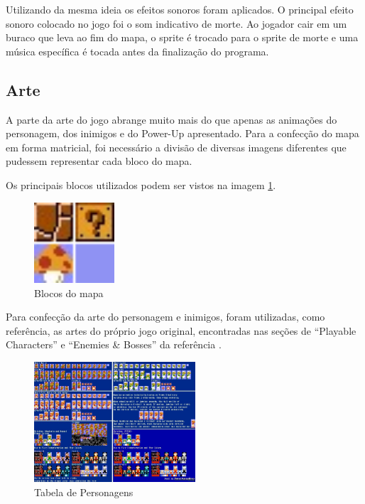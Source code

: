 \documentclass[11pt, twocolumn]{extarticle}
\begin{document}
Utilizando da mesma ideia os efeitos sonoros foram aplicados. O principal efeito sonoro colocado no jogo foi o som indicativo de morte. Ao jogador cair em um buraco que leva ao fim do mapa, o sprite é trocado para o sprite de morte e uma música específica é tocada antes da finalização do programa.

\subsection{Arte}
\label{Artes}
\indent \indent A parte da arte do jogo abrange muito mais do que apenas as animações do personagem, dos inimigos e do Power-Up apresentado. Para a confecção do mapa em forma matricial, foi necessário a divisão de diversas imagens diferentes que pudessem representar cada bloco do mapa.

Os principais blocos utilizados podem ser vistos na imagem \ref{image: Blocos do mapa}.

\begin{figure}[H]
	\centering
	\includegraphics[width=3cm]{figuras/Blocos.png}
	\caption{Blocos do mapa}
	\label{image: Blocos do mapa}
\end{figure}

Para confecção da arte do personagem e inimigos, foram utilizadas, como referência, as artes do próprio jogo original, encontradas nas seções de “Playable Characters” e “Enemies \& Bosses” da referência \cite{Sprites}. 

\begin{figure}[H]
	\centering
	\includegraphics[width=6cm]{figuras/Personagens1.jpeg}
	\caption{Tabela de Personagens}
	\label{image: Tabela de Personagens1}
\end{figure}
\end{document}
